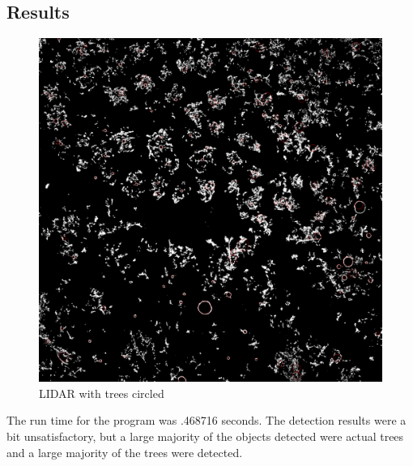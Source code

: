\documentclass[dvipsnames]{article}
\begin{document}
\subsection*{Results}
\begin{figure}[H]
	\centering\includegraphics[width=.75\linewidth]{Images/P-2/LiDAR01-circled.png}
	\caption{LIDAR with trees circled}
\end{figure}

The run time for the program was .468716 seconds. The detection results were a bit unsatisfactory, but a large majority of the objects detected were actual trees and a large majority of the trees were detected.
\end{document}
